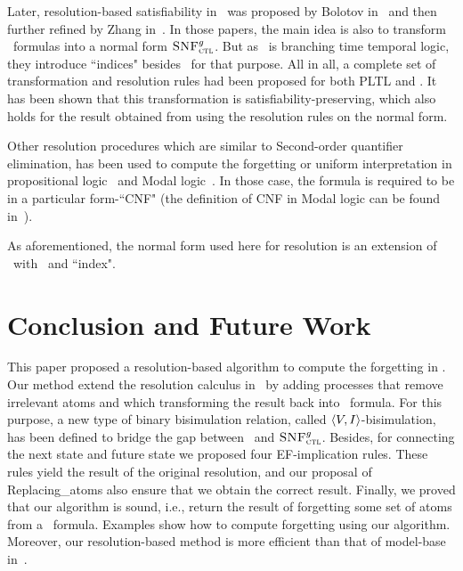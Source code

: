 \documentclass{article}
\begin{document}
Later,  resolution-based satisfiability in \CTL\ was proposed by Bolotov in~\cite{bolotov2000clausal}  and then further refined by Zhang in~\cite{zhang2009refined,zhang2014resolution}.
In those papers, the main idea is also to transform \CTL\ formulas into a normal form ${\textsc{SNF}_{\textsc{ctl}}^g}$.
But as \CTL\ is branching time temporal logic, they introduce ``indices" besides \start\ for that purpose. All in all, a complete set of transformation and resolution rules had been proposed for both PLTL and \CTL. It has been shown that this transformation is satisfiability-preserving, which also holds for the result obtained from using the resolution rules on the normal form.

Other resolution procedures which are similar to Second-order quantifier elimination, has been used to compute the forgetting or uniform interpretation in propositional logic~\cite{Yisong:2015:arx} and Modal logic~\cite{herzig2008uniform}. In those case, the formula is required to be in a particular form-``CNF" (the definition of CNF in Modal logic can be found in~\cite{herzig2008uniform}).

 As aforementioned, the normal form used here for resolution is an extension of \CTL\ with \start\ and ``index".

\section{Conclusion and Future Work}
This paper proposed a resolution-based algorithm to compute the forgetting in \CTL.
Our method extend the resolution calculus in~\cite{zhang2014resolution} by adding processes that remove  irrelevant atoms and which transforming the result back into \CTL\ formula.
For this purpose, a new type of binary bisimulation relation, called ${\langle{V,I}\rangle}$-bisimulation, has been defined to bridge the gap between \CTL\ and ${\textsc{SNF}_{\textsc{ctl}}^g}$. Besides, for connecting the next state and future state we proposed four EF-implication rules. These rules yield the result of the original resolution, and our proposal of Replacing\_atoms also ensure that we obtain the correct result.
Finally, we proved that our algorithm is sound, i.e., return the result of forgetting some set of atoms from a \CTL\ formula.
Examples show how to compute forgetting using our algorithm.
Moreover, our resolution-based method is more efficient than that of model-base in~\cite{renyansfirstpaper}.
\end{document}
